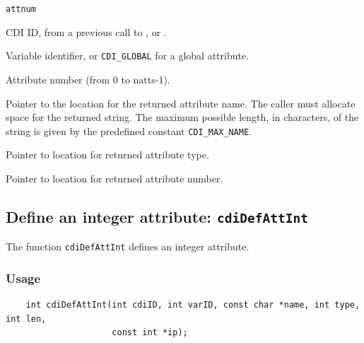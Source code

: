 \hspace*{4mm}\begin{minipage}[]{15cm}
\begin{deflist}{\texttt{attnum}\ }
\item[\texttt{cdiID}]
CDI ID, from a previous call to {}, {} or {}.
\item[\texttt{varID}]
Variable identifier, or {\texttt{CDI\_GLOBAL}} for a global attribute.
\item[\texttt{attnum}]
Attribute number (from 0 to natts-1).
\item[\texttt{name}]
Pointer to the location for the returned attribute name. The caller must allocate space for the
                    returned string. The maximum possible length, in characters, of
                    the string is given by the predefined constant {\texttt{CDI\_MAX\_NAME}}.
\item[\texttt{typep}]
Pointer to location for returned attribute type.
\item[\texttt{lenp}]
Pointer to location for returned attribute number.

\end{deflist}
\end{minipage}


\subsection{Define an integer attribute: \texttt{cdiDefAttInt}}
\label{cdiDefAttInt}

The function {\texttt{cdiDefAttInt}} defines an integer attribute.

\subsubsection*{Usage}

\begin{verbatim}
    int cdiDefAttInt(int cdiID, int varID, const char *name, int type, int len, 
                     const int *ip);
\end{verbatim}

